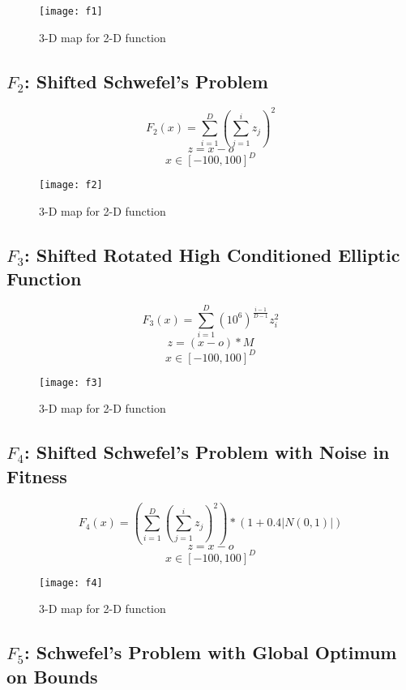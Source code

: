 \begin{figure}[H]
  \centering
  \texttt{[image: f1]}
  \caption{3-D map for 2-D function}
  \label{f1}
\end{figure}

\subsection{$F_2$: Shifted Schwefel’s Problem}

\begin{equation}
  F_2(x)=\sum_{i=1}^{D}{(\sum_{j=1}^{i}{z_j})^2}
\end{equation}
\[ z=x-o \]
\[ x \in [-100,100]^D \]

\begin{figure}[H]
  \centering
  \texttt{[image: f2]}
  \caption{3-D map for 2-D function}
  \label{f2}
\end{figure}

\subsection{$F_3$: Shifted Rotated High Conditioned Elliptic Function}

\begin{equation}
  F_3(x)=\sum_{i=1}^{D}{(10^6)^{\frac{i-1}{D-1}}z_i^2}
\end{equation}
\[ z=(x-o)*M \]
\[ x \in [-100,100]^D \]

\begin{figure}[H]
  \centering
  \texttt{[image: f3]}
  \caption{3-D map for 2-D function}
  \label{f3}
\end{figure}

\subsection{$F_4$: Shifted Schwefel’s Problem with Noise in Fitness}

\begin{equation}
  F_4(x)=(\sum_{i=1}^{D}{(\sum_{j=1}^{i}{z_j})^2})*(1+0.4|N(0,1)|)
\end{equation}
\[ z=x-o \]
\[ x \in [-100,100]^D \]

\begin{figure}[H]
  \centering
  \texttt{[image: f4]}
  \caption{3-D map for 2-D function}
  \label{f4}
\end{figure}

\subsection{$F_5$: Schwefel’s Problem with Global Optimum on Bounds}


